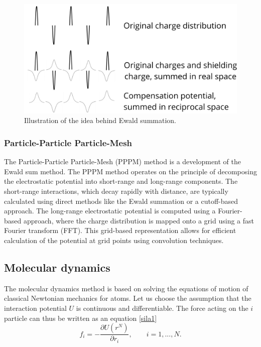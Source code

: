 \begin{figure}[htb!]
	\centering
	\includegraphics[width=0.8\linewidth]{img/ewald.png} 
	\caption{Illustration of the idea behind Ewald summation.}
	\label{fig:ewald}    
\end{figure} 

\subsubsection{Particle-Particle Particle-Mesh}
The Particle-Particle Particle-Mesh (PPPM) method \cite{eastwood_p3m3dpthree-dimensional_1980} is a development of the Ewald sum method. The PPPM method operates on the principle of decomposing the electrostatic potential into short-range and long-range components. The short-range interactions, which decay rapidly with distance, are typically calculated using direct methods like the Ewald summation or a cutoff-based approach. The long-range electrostatic potential is computed using a Fourier-based approach, where the charge distribution is mapped onto a grid using a fast Fourier transform (FFT). This grid-based representation allows for efficient calculation of the potential at grid points using convolution techniques. \cite{Sritterova}


\subsection{Molecular dynamics}
The molecular dynamics method is based on solving the equations of motion of classical Newtonian mechanics for atoms. Let us choose the assumption that the interaction potential $U$ is continuous and differentiable. The force acting on the $i$ particle can thus be written as an equation \ref{sila1} 
\begin{equation}\label{sila1}
	f_i=-\frac{\partial U(r^N)}{\partial r_i}, \qquad i=1,...,N.
\end{equation}

